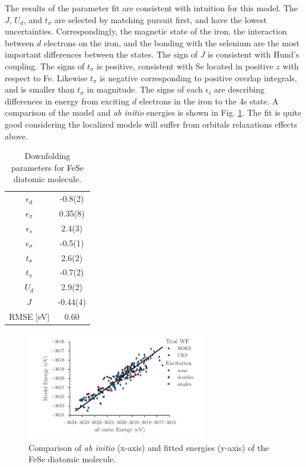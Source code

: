 The results of the parameter fit are consistent with intuition for this model. 
The $J$, $U_d$, and $t_\sigma$ are selected by matching pursuit first, and have the lowest uncertainties.
Correspondingly, the magnetic state of the iron, the interaction between $d$ electrons on the iron, and the bonding with the selenium are the most important differences between the states.
The sign of $J$ is consistent with Hund's coupling. 
The signs of $t_\sigma$ is positive, consistent with Se located in positive $z$ with respect to Fe. 
Likewise $t_\pi$ is negative corresponding to positive overlap integrals, and is smaller than $t_\sigma$ in magnitude.
The signs of each $\epsilon_i$ are describing differences in energy from exciting $d$ electrons in the iron to the 4s state.
A comparison of the model and \textit{ab initio} energies is shown in Fig. \ref{fig:fese}.
The fit is quite good considering the localized models will suffer from orbitals relaxations effects above. 

\begin{table}[ht]
\label{tab:fese}
\centering
\begin{tabular}{|c|c|}
\hline
  $\epsilon_d$       &  -0.8(2) \\
  $\epsilon_\pi$     &  0.35(8) \\
  $\epsilon_s$       &  2.4(3)  \\
  $\epsilon_\sigma$  &  -0.5(1) \\
  $t_\sigma$         &  2.6(2)  \\
  $t_\pi$            &  -0.7(2) \\
  $U_d$              &  2.9(2)  \\
  $J$                &  -0.44(4) \\
\hline
  RMSE [eV] & 0.60 \\
\hline
\end{tabular}
\caption{Downfolding parameters for FeSe diatomic molecule.}
\end{table} 

\begin{figure}[htb]
\centering
\includegraphics[width=0.7\textwidth]{./Figures/fese.pdf}
  \caption{
    Comparison of \textit{ab initio} (x-axis) and fitted energies (y-axis) of the FeSe diatomic molecule.
  }
  \label{fig:fese}
\end{figure}
